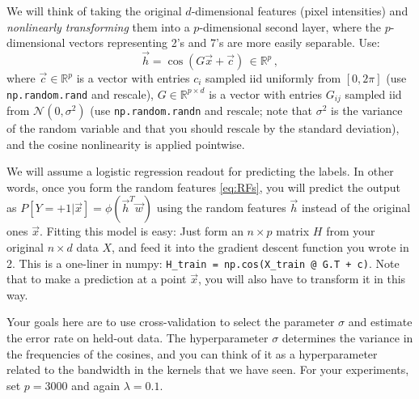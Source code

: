 \documentclass{article}
\newcommand{\R}{\mathbb{R}} %
\begin{document}
We will think of taking the original $d$-dimensional features (pixel intensities)
and {\em nonlinearly transforming} them into a $p$-dimensional second layer,
where the $p$-dimensional vectors representing 2's and 7's are more easily separable.
Use:
\begin{equation}
  \vec h = \cos(G \vec x + \vec c) \, \in \R^p \,,
\label{eq:RFs}
\end{equation}
where $\vec c \in \R^p$ is a vector with entries $c_i$ sampled iid uniformly from $[0, 2\pi]$
(use {\tt np.random.rand} and rescale),
$G \in \R^{p \times d}$ is a vector with entries $G_{ij}$ sampled iid
from $\mathcal{N}(0, \sigma^2)$
(use {\tt np.random.randn} and rescale;
note that $\sigma^2$ is the variance of the random variable
and that you should rescale by the standard deviation),
and the cosine nonlinearity is applied pointwise.

We will assume a logistic regression readout for predicting the labels.
In other words, once you form the random features \eqref{eq:RFs},
you will predict the output as $P[Y = +1 | \vec x] = \phi(\vec h^T \vec w)$
using the random features $\vec h$ instead of the original ones $\vec x$.
Fitting this model is easy: Just form an $n \times p$ matrix $H$
from your original $n \times d$ data $X$, and feed it into the
gradient descent function you wrote in 2.
This is a one-liner in numpy:
{\tt H\_train = np.cos(X\_train @ G.T + c)}.
Note that to make a prediction at a point $\vec x$, you will also have 
to transform it in this way.

Your goals here are to use cross-validation to select the parameter $\sigma$
and estimate the error rate on held-out data.
The hyperparameter $\sigma$ determines the variance in the frequencies of the cosines,
and you can think of it as a hyperparameter related to the bandwidth in the kernels
that we have seen.
For your experiments, set $p = 3000$ and again $\lambda = 0.1$.
\end{document}
